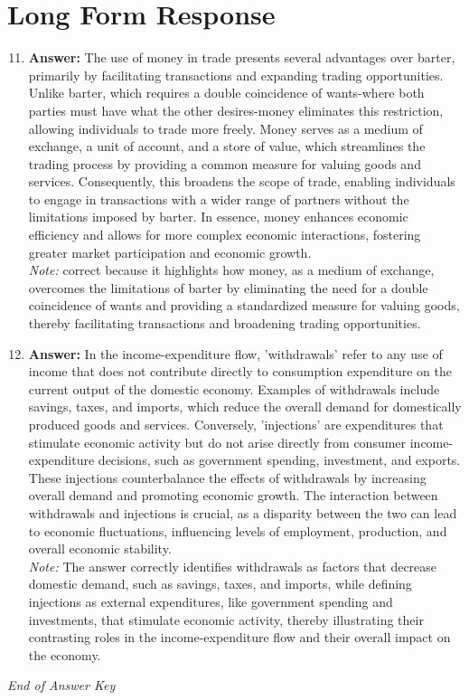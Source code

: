 \documentclass[12pt]{article}
\begin{document}
\section*{Long Form Response}
\begin{enumerate}[label=\arabic*.]
\setcounter{enumi}{10}
\item \textbf{Answer:} The use of money in trade presents several advantages over barter, primarily by facilitating transactions and expanding trading opportunities. Unlike barter, which requires a double coincidence of wants-where both parties must have what the other desires-money eliminates this restriction, allowing individuals to trade more freely. Money serves as a medium of exchange, a unit of account, and a store of value, which streamlines the trading process by providing a common measure for valuing goods and services. Consequently, this broadens the scope of trade, enabling individuals to engage in transactions with a wider range of partners without the limitations imposed by barter. In essence, money enhances economic efficiency and allows for more complex economic interactions, fostering greater market participation and economic growth.
\\ \textit{Note:} correct because it highlights how money, as a medium of exchange, overcomes the limitations of barter by eliminating the need for a double coincidence of wants and providing a standardized measure for valuing goods, thereby facilitating transactions and broadening trading opportunities.
\item \textbf{Answer:} In the income-expenditure flow, 'withdrawals' refer to any use of income that does not contribute directly to consumption expenditure on the current output of the domestic economy. Examples of withdrawals include savings, taxes, and imports, which reduce the overall demand for domestically produced goods and services. Conversely, 'injections' are expenditures that stimulate economic activity but do not arise directly from consumer income-expenditure decisions, such as government spending, investment, and exports. These injections counterbalance the effects of withdrawals by increasing overall demand and promoting economic growth. The interaction between withdrawals and injections is crucial, as a disparity between the two can lead to economic fluctuations, influencing levels of employment, production, and overall economic stability.
\\ \textit{Note:} The answer correctly identifies withdrawals as factors that decrease domestic demand, such as savings, taxes, and imports, while defining injections as external expenditures, like government spending and investments, that stimulate economic activity, thereby illustrating their contrasting roles in the income-expenditure flow and their overall impact on the economy.
\end{enumerate}

\vfill
\noindent\textit{End of Answer Key}
\end{document}
